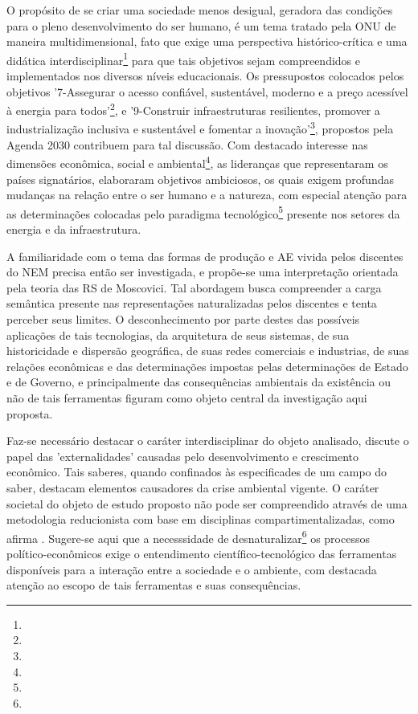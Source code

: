 \documentclass[
  12pt,       %
  openright,      %
  twoside,      %
  a4paper,      %
  english,      %
  french,       %
  spanish,      %
  brazil        %
  ]{abntex2}
\begin{document}
O propósito de se criar uma sociedade menos desigual, geradora das condições para o pleno desenvolvimento do ser humano, é um tema tratado pela ONU de maneira multidimensional, fato que exige uma perspectiva histórico-crítica e uma didática interdisciplinar\footnote{} para que tais objetivos sejam compreendidos e implementados nos diversos níveis educacionais. Os pressupostos colocados pelos objetivos '7-Assegurar o acesso confiável, sustentável, moderno e a preço
acessível à energia para todos'\footnote{}, e '9-Construir infraestruturas resilientes, promover a industrialização inclusiva e sustentável e fomentar a inovação'\footnote{}, propostos pela Agenda 2030 contribuem para tal discussão. Com destacado interesse nas dimensões econômica, social e ambiental\footnote{}, as lideranças que representaram os países signatários, elaboraram objetivos ambiciosos, os quais exigem profundas mudanças na relação entre o ser humano e a natureza, com especial atenção para as determinações colocadas pelo paradigma tecnológico\footnote{} presente nos setores da energia e da infraestrutura.

A familiaridade com o tema das formas de produção e AE vivida pelos discentes do NEM precisa então ser investigada, e propõe-se uma interpretação orientada pela teoria das RS de Moscovici. Tal abordagem busca compreender a carga semântica presente nas representações naturalizadas pelos discentes e tenta perceber seus limites. O desconhecimento por parte destes das possíveis aplicações de tais tecnologias, da arquitetura de seus sistemas, de sua historicidade e dispersão geográfica, de suas redes comerciais e industrias, de suas relações econômicas e das determinações impostas pelas determinações de Estado e de Governo, e principalmente das consequências ambientais da existência ou não de tais ferramentas figuram como objeto central da investigação aqui proposta.

Faz-se necessário destacar o caráter interdisciplinar do objeto analisado,  discute o papel das 'externalidades' causadas pelo desenvolvimento e crescimento econômico. Tais saberes, quando confinados às especificades de um campo do saber, destacam elementos causadores da crise ambiental vigente. O caráter societal do objeto de estudo proposto não pode ser compreendido através de uma metodologia reducionista com base em disciplinas compartimentalizadas, como afirma . Sugere-se aqui que a necesssidade de desnaturalizar\footnote{} os processos político-econômicos exige o entendimento científico-tecnológico das ferramentas disponíveis para a interação entre a sociedade e o ambiente, com destacada atenção ao escopo de tais ferramentas e suas consequências.
\end{document}
